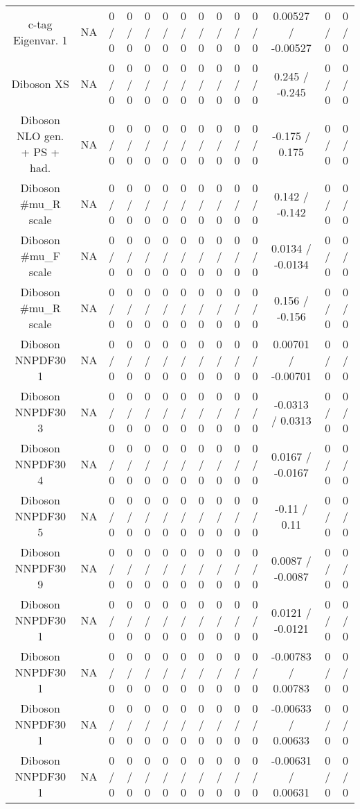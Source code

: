 \documentclass[10pt]{article}
\begin{document}
\begin{table}[htbp]
\begin{center}
\begin{tabular}{|c|c|c|c|c|c|c|c|c|c|c|c|c|c|}
  c-tag Eigenvar. 1 &    NA    & 0 / 0 & 0 / 0 & 0 / 0 & 0 / 0 & 0 / 0 & 0 / 0 & 0 / 0 & 0 / 0 & 0 / 0 & 0.00527 / -0.00527 & 0 / 0 & 0 / 0 \\ 
  Diboson XS &    NA    & 0 / 0 & 0 / 0 & 0 / 0 & 0 / 0 & 0 / 0 & 0 / 0 & 0 / 0 & 0 / 0 & 0 / 0 & 0.245 / -0.245 & 0 / 0 & 0 / 0 \\ 
  Diboson NLO gen. + PS + had. &    NA    & 0 / 0 & 0 / 0 & 0 / 0 & 0 / 0 & 0 / 0 & 0 / 0 & 0 / 0 & 0 / 0 & 0 / 0 & -0.175 / 0.175 & 0 / 0 & 0 / 0 \\ 
  Diboson #mu_{R} scale &    NA    & 0 / 0 & 0 / 0 & 0 / 0 & 0 / 0 & 0 / 0 & 0 / 0 & 0 / 0 & 0 / 0 & 0 / 0 & 0.142 / -0.142 & 0 / 0 & 0 / 0 \\ 
  Diboson #mu_{F} scale &    NA    & 0 / 0 & 0 / 0 & 0 / 0 & 0 / 0 & 0 / 0 & 0 / 0 & 0 / 0 & 0 / 0 & 0 / 0 & 0.0134 / -0.0134 & 0 / 0 & 0 / 0 \\ 
  Diboson #mu_{R} scale &    NA    & 0 / 0 & 0 / 0 & 0 / 0 & 0 / 0 & 0 / 0 & 0 / 0 & 0 / 0 & 0 / 0 & 0 / 0 & 0.156 / -0.156 & 0 / 0 & 0 / 0 \\ 
  Diboson NNPDF30 1 &    NA    & 0 / 0 & 0 / 0 & 0 / 0 & 0 / 0 & 0 / 0 & 0 / 0 & 0 / 0 & 0 / 0 & 0 / 0 & 0.00701 / -0.00701 & 0 / 0 & 0 / 0 \\ 
  Diboson NNPDF30 3 &    NA    & 0 / 0 & 0 / 0 & 0 / 0 & 0 / 0 & 0 / 0 & 0 / 0 & 0 / 0 & 0 / 0 & 0 / 0 & -0.0313 / 0.0313 & 0 / 0 & 0 / 0 \\ 
  Diboson NNPDF30 4 &    NA    & 0 / 0 & 0 / 0 & 0 / 0 & 0 / 0 & 0 / 0 & 0 / 0 & 0 / 0 & 0 / 0 & 0 / 0 & 0.0167 / -0.0167 & 0 / 0 & 0 / 0 \\ 
  Diboson NNPDF30 5 &    NA    & 0 / 0 & 0 / 0 & 0 / 0 & 0 / 0 & 0 / 0 & 0 / 0 & 0 / 0 & 0 / 0 & 0 / 0 & -0.11 / 0.11 & 0 / 0 & 0 / 0 \\ 
  Diboson NNPDF30 9 &    NA    & 0 / 0 & 0 / 0 & 0 / 0 & 0 / 0 & 0 / 0 & 0 / 0 & 0 / 0 & 0 / 0 & 0 / 0 & 0.0087 / -0.0087 & 0 / 0 & 0 / 0 \\ 
  Diboson NNPDF30 1 &    NA    & 0 / 0 & 0 / 0 & 0 / 0 & 0 / 0 & 0 / 0 & 0 / 0 & 0 / 0 & 0 / 0 & 0 / 0 & 0.0121 / -0.0121 & 0 / 0 & 0 / 0 \\ 
  Diboson NNPDF30 1 &    NA    & 0 / 0 & 0 / 0 & 0 / 0 & 0 / 0 & 0 / 0 & 0 / 0 & 0 / 0 & 0 / 0 & 0 / 0 & -0.00783 / 0.00783 & 0 / 0 & 0 / 0 \\ 
  Diboson NNPDF30 1 &    NA    & 0 / 0 & 0 / 0 & 0 / 0 & 0 / 0 & 0 / 0 & 0 / 0 & 0 / 0 & 0 / 0 & 0 / 0 & -0.00633 / 0.00633 & 0 / 0 & 0 / 0 \\ 
  Diboson NNPDF30 1 &    NA    & 0 / 0 & 0 / 0 & 0 / 0 & 0 / 0 & 0 / 0 & 0 / 0 & 0 / 0 & 0 / 0 & 0 / 0 & -0.00631 / 0.00631 & 0 / 0 & 0 / 0 \\ 

\end{tabular}
\end{center}
\end{table}
\end{document}
